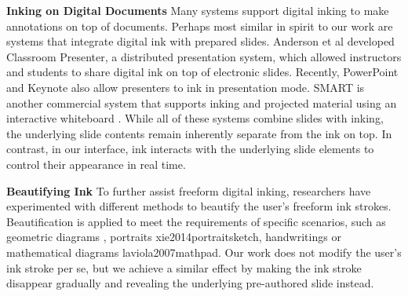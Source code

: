 \textbf{Inking on Digital Documents} Many systems \cite{yoon2014richreview, marshall1999collaborating, hardock1993marking} support digital inking to make annotations on top of documents. Perhaps most similar in spirit to our work are systems that integrate digital ink with prepared slides. Anderson et al \cite{anderson2007classroom} developed Classroom Presenter, a distributed presentation system, which allowed instructors and students to share digital ink on top of electronic slides. Recently, PowerPoint and Keynote also allow presenters to ink in presentation mode. SMART is another commercial system that supports inking and projected material using an interactive whiteboard \cite{smarttech2017}. While all of these systems combine slides with inking, the underlying slide contents remain inherently separate from the ink on top. In contrast, in our interface, ink interacts with the underlying slide elements to control their appearance in real time.  

\textbf{Beautifying Ink} To further assist freeform digital inking, researchers have experimented with different methods to beautify the user's freeform ink strokes. Beautification is applied to meet the requirements of specific scenarios, such as geometric diagrams \cite{igarashi1998pegasus, hse2005recognition, fivser2015shipshape}, portraits {xie2014portraitsketch}, handwritings \cite{zitnick2013handwriting} or mathematical diagrams {laviola2007mathpad}. Our work does not modify the user's ink stroke per se, but we achieve a similar effect by making the ink stroke disappear gradually and revealing the underlying pre-authored slide instead.
